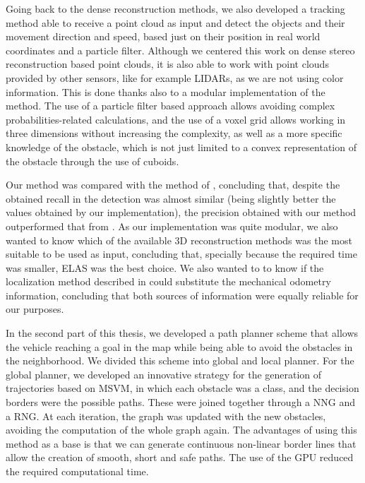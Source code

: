 Going back to the dense reconstruction methods, we also developed a tracking method able to receive a point cloud as input and detect the objects and their movement direction and speed, based just on their position in real world coordinates and a particle filter. Although we centered this work on dense stereo reconstruction based point clouds, it is also able to work with point clouds provided by other sensors, like for example \acp{LIDAR}, as we are not using color information. This is done thanks also to a modular implementation of the method. The use of a particle filter based approach allows avoiding complex probabilities-related calculations, and the use of a voxel grid allows working in three dimensions without increasing the complexity, as well as a more specific knowledge of the obstacle, which is not just limited to a convex representation of the obstacle through the use of cuboids.

Our method was compared with the method of \cite{danescu2012particle}, concluding that, despite the obtained recall in the detection was almost similar (being slightly better the values obtained by our implementation), the precision obtained with our method outperformed that from \cite{danescu2012particle}. As our implementation was quite modular, we also wanted to know which of the available 3D reconstruction methods was the most suitable to be used as input, concluding that, specially because the required time was smaller, \ac{ELAS} was the best choice. We also wanted to to know if the localization method described in \cite{geiger2011stereoscan} could substitute the mechanical odometry information, concluding that both sources of information were equally reliable for our purposes.

In the second part of this thesis, we developed a path planner scheme that allows the vehicle reaching a goal in the map while being able to avoid the obstacles in the neighborhood. We divided this scheme into global and local planner. For the global planner, we developed an innovative strategy for the generation of trajectories based on \ac{MSVM}, in which each obstacle was a class, and the decision borders were the possible paths. These were joined together through a \acl{NNG} and a \acl{RNG}. At each iteration, the graph was updated with the new obstacles, avoiding the computation of the whole graph again. The advantages of using this method as a base is that we can generate continuous non-linear border lines that allow the creation of smooth, short and safe paths. The use of the \ac{GPU} reduced the required computational time.

